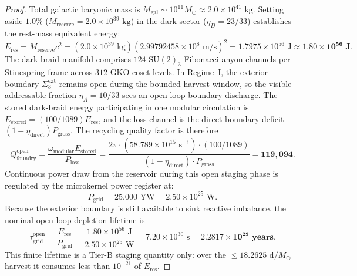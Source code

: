 \documentclass[11pt,onecolumn]{article}
\begin{document}
\begin{proof}
Total galactic baryonic mass is $M_{\text{gal}} \sim 10^{11} M_\odot \approx 2.0 \times 10^{41}\text{ kg}$. Setting aside $1.0\%$ ($M_{\text{reserve}} = 2.0 \times 10^{39}\text{ kg}$) in the dark sector ($\eta_D = 23/33$) establishes the rest-mass equivalent energy:
\begin{equation}
E_{\text{res}} = M_{\text{reserve}} c^2 = (2.0 \times 10^{39}\text{ kg}) (2.99792458 \times 10^8\text{ m/s})^2 = 1.7975 \times 10^{56}\text{ J} \approx \mathbf{1.80 \times 10^{56}\text{ J}}.
\label{eq:e_res_numeric}
\end{equation}
The dark-braid manifold comprises $124$ $\text{SU}(2)_3$ Fibonacci anyon channels per Stinespring frame across $312$ GKO coset levels. In Regime~I, the exterior boundary $\Sigma_3^{\text{ext}}$ remains open during the bounded harvest window, so the visible-addressable fraction $\eta_A=10/33$ sees an open-loop boundary discharge. The stored dark-braid energy participating in one modular circulation is $E_{\text{stored}} = (100/1089)E_{\text{res}}$, and the loss channel is the direct-boundary deficit $(1-\eta_{\text{direct}})P_{\text{gross}}$. The recycling quality factor is therefore
\begin{equation}
Q_{\text{foundry}}^{\text{open}}
= \frac{\omega_{\text{modular}} E_{\text{stored}}}{P_{\text{loss}}}
= \frac{2\pi \cdot (58.789 \times 10^{15}\text{ s}^{-1}) \cdot (100/1089)}
       {(1 - \eta_{\text{direct}}) \cdot P_{\text{gross}}}
= \mathbf{119{,}094}.
\label{eq:q_foundry_open_derivation}
\end{equation}
Continuous power draw from the reservoir during this open staging phase is regulated by the microkernel power register  at:
\begin{equation}
P_{\text{grid}} = 25.000\text{ YW} = 2.50 \times 10^{25}\text{ W}.
\label{eq:p_grid_numeric}
\end{equation}
Because the exterior boundary is still available to sink reactive imbalance, the nominal open-loop depletion lifetime is
\begin{equation}
\tau_{\text{grid}}^{\text{open}}
= \frac{E_{\text{res}}}{P_{\text{grid}}}
= \frac{1.80 \times 10^{56}\text{ J}}{2.50 \times 10^{25}\text{ W}}
= 7.20 \times 10^{30}\text{ s}
= \mathbf{2.2817 \times 10^{23}\text{ years}}.
\label{eq:tau_grid_open_derivation}
\end{equation}
This finite lifetime is a Tier-B staging quantity only: over the $\le 18.2625\text{ d}/M_\odot$ harvest it consumes less than $10^{-21}$ of $E_{\text{res}}$.


\end{proof}
\end{document}
